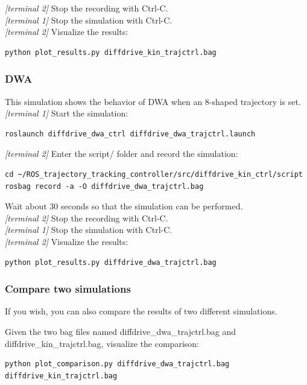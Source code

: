 \documentclass[11pt,a4paper]{article}
\begin{document}
\textit{[terminal 2]} Stop the recording with Ctrl-C.\\

\textit{[terminal 1]} Stop the simulation with Ctrl-C.\\

\textit{[terminal 2]} Visualize the results:
\begin{lstlisting}
python plot_results.py diffdrive_kin_trajctrl.bag
\end{lstlisting}

\subsubsection{DWA}

This simulation shows the behavior of DWA when an 8-shaped trajectory is set.\\

\textit{[terminal 1]} Start the simulation:
\begin{lstlisting}
roslaunch diffdrive_dwa_ctrl diffdrive_dwa_trajctrl.launch
\end{lstlisting}

\textit{[terminal 2]} Enter the script/ folder and record the simulation:
\begin{lstlisting}
cd ~/ROS_trajectory_tracking_controller/src/diffdrive_kin_ctrl/script
rosbag record -a -O diffdrive_dwa_trajctrl.bag
\end{lstlisting}

Wait about 30 seconds so that the simulation can be performed.\\

\textit{[terminal 2]} Stop the recording with Ctrl-C.\\

\textit{[terminal 1]} Stop the simulation with Ctrl-C.\\

\textit{[terminal 2]} Visualize the results:
\begin{lstlisting}
python plot_results.py diffdrive_dwa_trajctrl.bag
\end{lstlisting}

\subsubsection{Compare two simulations}

If you wish, you can also compare the results of two different simulations.

Given the two bag files named diffdrive\_dwa\_trajctrl.bag and diffdrive\_kin\_trajctrl.bag, visualize the comparison:
\begin{lstlisting}
python plot_comparison.py diffdrive_dwa_trajctrl.bag diffdrive_kin_trajctrl.bag
\end{lstlisting}
\end{document}
